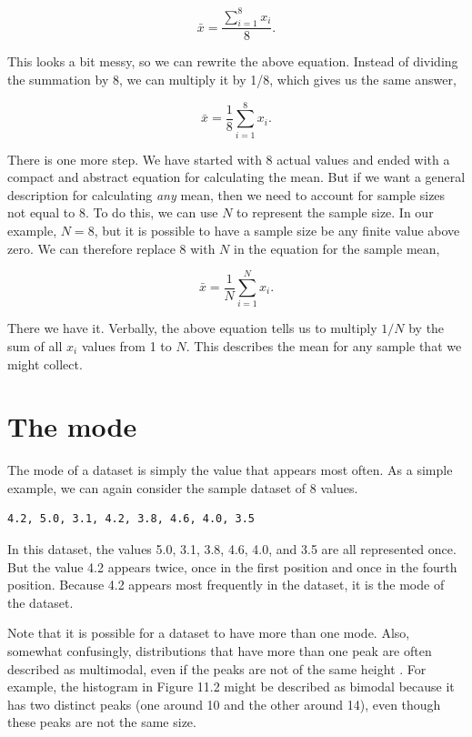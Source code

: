 \documentclass[
]{scrbook}
\begin{document}
\[\bar{x} = \frac{\sum_{i = 1}^{8}x_{i}}{8}.\]

This looks a bit messy, so we can rewrite the above equation.
Instead of dividing the summation by 8, we can multiply it by 1/8, which gives us the same answer,

\[\bar{x} = \frac{1}{8}\sum_{i = 1}^{8}x_{i}.\]

There is one more step.
We have started with 8 actual values and ended with a compact and abstract equation for calculating the mean.
But if we want a general description for calculating \emph{any} mean, then we need to account for sample sizes not equal to 8.
To do this, we can use \(N\) to represent the sample size.
In our example, \(N = 8\), but it is possible to have a sample size be any finite value above zero.
We can therefore replace 8 with \(N\) in the equation for the sample mean,

\[\bar{x} = \frac{1}{N}\sum_{i = 1}^{N}x_{i}.\]

There we have it.
Verbally, the above equation tells us to multiply \(1/N\) by the sum of all \(x_{i}\) values from 1 to \(N\).
This describes the mean for any sample that we might collect.

\hypertarget{the-mode}{%
\section{The mode}\label{the-mode}}

The mode of a dataset is simply the value that appears most often.
As a simple example, we can again consider the sample dataset of 8 values.

\begin{verbatim}
4.2, 5.0, 3.1, 4.2, 3.8, 4.6, 4.0, 3.5
\end{verbatim}

In this dataset, the values 5.0, 3.1, 3.8, 4.6, 4.0, and 3.5 are all represented once.
But the value 4.2 appears twice, once in the first position and once in the fourth position.
Because 4.2 appears most frequently in the dataset, it is the mode of the dataset.

Note that it is possible for a dataset to have more than one mode.
Also, somewhat confusingly, distributions that have more than one peak are often described as multimodal, even if the peaks are not of the same height \citep{Sokal1995}.
For example, the histogram in Figure 11.2 might be described as bimodal because it has two distinct peaks (one around 10 and the other around 14), even though these peaks are not the same size.
\end{document}
